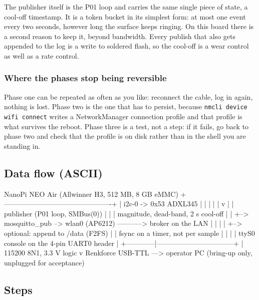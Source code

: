 The publisher itself is the P01 loop and carries the same single piece of state, a cool-off timestamp. It is a token bucket in its simplest form: at most one event every two seconds, however long the surface keeps ringing. On this board there is a second reason to keep it, beyond bandwidth. Every publish that also gets appended to the log is a write to soldered flash, so the cool-off is a wear control as well as a rate control.

\subsubsection*{Where the phases stop being reversible}

Phase one can be repeated as often as you like: reconnect the cable, log in again, nothing is lost. Phase two is the one that has to persist, because \texttt{nmcli device wifi connect} writes a NetworkManager connection profile and that profile is what survives the reboot. Phase three is a test, not a step: if it fails, go back to phase two and check that the profile is on disk rather than in the shell you are standing in.

\subsection*{Data flow (ASCII)}

\begin{asciiart}
  NanoPi NEO Air (Allwinner H3, 512 MB, 8 GB eMMC)
  +----------------------------------------------+
  |  i2c-0 -> 0x53 ADXL345                        |
  |     |                                         |
  |     v                                         |
  |  publisher (P01 loop, SMBus(0))               |
  |     |  magnitude, dead-band, 2 s cool-off     |
  |     +--> mosquitto_pub --> wlan0 (AP6212) -----------> broker on the LAN
  |     |                                         |
  |     +--> optional: append to /data (F2FS)     |
  |            fsync on a timer, not per sample   |
  |                                               |
  |  ttyS0 console on the 4-pin UART0 header      |
  +------------|---------------------------------+
               |  115200 8N1, 3.3 V logic
               v
        Renkforce USB-TTL ---> operator PC   (bring-up only, unplugged for acceptance)
\end{asciiart}

\subsection*{Steps}

